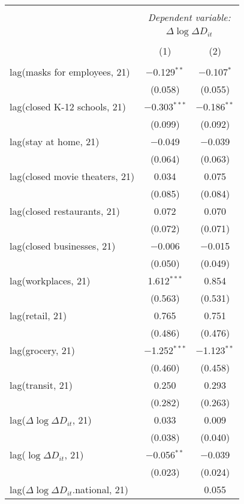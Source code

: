 \begin{tabular}{@{\extracolsep{1pt}}lcc} 
\\[-1.8ex]\hline 
\hline \\[-1.8ex] 
 & \multicolumn{2}{c}{\textit{Dependent variable:}} \\ 
\cline{2-3} 
 & \multicolumn{2}{c}{$\Delta \log \Delta D_{it}$} \\ 
\\[-1.8ex] & (1) & (2)\\ 
\hline \\[-1.8ex] 
 lag(masks for employees, 21) & $-$0.129$^{**}$ & $-$0.107$^{*}$ \\ 
  & (0.058) & (0.055) \\ 
  lag(closed K-12 schools, 21) & $-$0.303$^{***}$ & $-$0.186$^{**}$ \\ 
  & (0.099) & (0.092) \\ 
  lag(stay at home, 21) & $-$0.049 & $-$0.039 \\ 
  & (0.064) & (0.063) \\ 
  lag(closed movie theaters, 21) & 0.034 & 0.075 \\ 
  & (0.085) & (0.084) \\ 
  lag(closed restaurants, 21) & 0.072 & 0.070 \\ 
  & (0.072) & (0.071) \\ 
  lag(closed businesses, 21) & $-$0.006 & $-$0.015 \\ 
  & (0.050) & (0.049) \\ 
  lag(workplaces, 21) & 1.612$^{***}$ & 0.854 \\ 
  & (0.563) & (0.531) \\ 
  lag(retail, 21) & 0.765 & 0.751 \\ 
  & (0.486) & (0.476) \\ 
  lag(grocery, 21) & $-$1.252$^{***}$ & $-$1.123$^{**}$ \\ 
  & (0.460) & (0.458) \\ 
  lag(transit, 21) & 0.250 & 0.293 \\ 
  & (0.282) & (0.263) \\ 
  lag($\Delta \log \Delta D_{it}$, 21) & 0.033 & 0.009 \\ 
  & (0.038) & (0.040) \\ 
  lag($\log \Delta D_{it}$, 21) & $-$0.056$^{**}$ & $-$0.039 \\ 
  & (0.023) & (0.024) \\ 
  lag($\Delta \log \Delta D_{it}$.national, 21) &  & 0.055 \\ 

\end{tabular}
